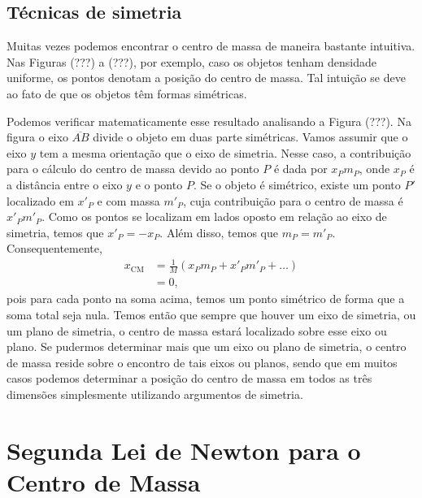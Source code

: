 \subsection{Técnicas de simetria}

Muitas vezes podemos encontrar o centro de massa de maneira bastante intuitiva. Nas Figuras (???) a (???), por exemplo, caso os objetos tenham densidade uniforme, os pontos denotam a posição do centro de massa. Tal intuição se deve ao fato de que os objetos têm formas simétricas. 

Podemos verificar matematicamente esse resultado analisando a Figura (???). Na figura o eixo $\overline{AB}$ divide o objeto em duas parte simétricas. Vamos assumir que o eixo $y$ tem a mesma orientação que o eixo de simetria. Nesse caso, a contribuição para o cálculo do centro de massa devido ao ponto $P$ é dada por $x_P m_P$, onde $x_P$ é a distância entre o eixo $y$ e o ponto $P$. Se o objeto é simétrico, existe um ponto $P'$ localizado em $x'_P$ e com massa $m'_P$, cuja contribuição para o centro de massa é $x'_Pm'_P$. Como os pontos se localizam em lados oposto em relação ao eixo de simetria, temos que $x'_P = - x_P$. Além disso, temos que $m_P = m'_P$. Consequentemente,
\begin{align}
  x_\textrm{CM} &= \frac{1}{M} (x_P m_P + x'_P m'_P + \dots) \\
  &= 0,
\end{align}
%
pois para cada ponto na soma acima, temos um ponto simétrico de forma que a soma total seja nula. Temos então que sempre que houver um eixo de simetria, ou um plano de simetria, o centro de massa estará localizado sobre esse eixo ou plano. Se pudermos determinar mais que um eixo ou plano de simetria, o centro de massa reside sobre o encontro de tais eixos ou planos, sendo que em muitos casos podemos determinar a posição do centro de massa em todos as três dimensões simplesmente utilizando argumentos de simetria.


\section{Segunda Lei de Newton para o Centro de Massa}

